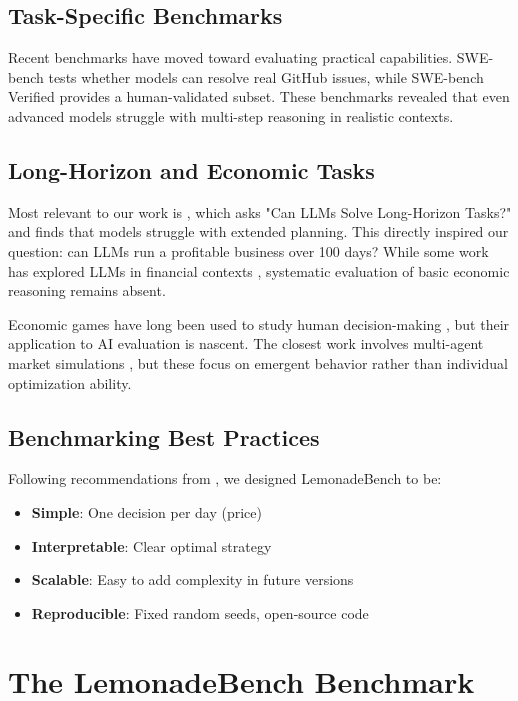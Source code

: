 \documentclass[11pt]{article}
\begin{document}
\subsection{Task-Specific Benchmarks}

Recent benchmarks have moved toward evaluating practical capabilities.
SWE-bench \citep{jimenez2024swebench} tests whether models can resolve real GitHub issues, while SWE-bench Verified \citep{chowdhury2024swebenchverified} provides a human-validated subset.
These benchmarks revealed that even advanced models struggle with multi-step reasoning in realistic contexts.

\subsection{Long-Horizon and Economic Tasks}

Most relevant to our work is \citet{kambhampati2024longhorizon}, which asks "Can LLMs Solve Long-Horizon Tasks?" and finds that models struggle with extended planning.
This directly inspired our question: can LLMs run a profitable business over 100 days?
While some work has explored LLMs in financial contexts \citep{wu2023bloomberggpt}, systematic evaluation of basic economic reasoning remains absent.

Economic games have long been used to study human decision-making \citep{camerer2003behavioral}, but their application to AI evaluation is nascent.
The closest work involves multi-agent market simulations \citep{horton2023large}, but these focus on emergent behavior rather than individual optimization ability.

\subsection{Benchmarking Best Practices}

Following recommendations from \citet{bowman2023benchmarking}, we designed LemonadeBench to be:
\begin{itemize}
    \item \textbf{Simple}: One decision per day (price)
    \item \textbf{Interpretable}: Clear optimal strategy
    \item \textbf{Scalable}: Easy to add complexity in future versions
    \item \textbf{Reproducible}: Fixed random seeds, open-source code
\end{itemize}

\section{The LemonadeBench Benchmark}
\end{document}
